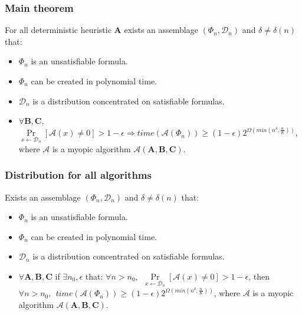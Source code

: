 \begin{frame}
	\frametitle{Main theorem}
	\pause
	\begin{theorem}
        For all deterministic heuristic $\mathbf{A}$
        exists an assemblage $(\Phi_n, \mathcal{D}_n)$ and $\delta \ne
        \delta(n)$ that:
        \pause
		\begin{itemize}
            \item $\Phi_n$ is an unsatisfiable formula.
        	\item $\Phi_n$ can be created in polynomial time.
            \pause
            \item $\mathcal{D}_n$ is a distribution concentrated on
		        satisfiable formulas.
            \pause
			\item $\forall \mathbf{B}, \mathbf{C}$,
				$\Pr\limits_{x \gets \mathcal{D}_n}[\mathcal{A}(x)
                \ne 0] > 1 - \epsilon \Rightarrow
                time(\mathcal{A}(\Phi_n)) \ge (1 - \epsilon) 2^{\Omega(min(n^\delta,
                \frac{n}{K}))}$, where $\mathcal{A}$ is a myopic algorithm
			    $\mathcal{A}(\mathbf{A}, \mathbf{B},\mathbf{C})$.
		\end{itemize}
	\end{theorem}
\end{frame}

\begin{frame}
    \frametitle{Distribution for all algorithms}

    \begin{theorem}
        Exists an assemblage $(\Phi_n, \mathcal{D}_n)$ and $\delta \ne
        \delta(n)$ that:
        \pause
        \begin{itemize}
            \item $\Phi_n$ is an unsatisfiable formula.
        	\item $\Phi_n$ can be created in polynomial time.
        	\pause
            \item $\mathcal{D}_n$ is a distribution concentrated on
		        satisfiable formulas.
            \pause
            \item $\forall \mathbf{A}, \mathbf{B}, \mathbf{C}$ 
		        if $\exists n_0, \epsilon$ that:
				$\forall n > n_0, ~~ \Pr\limits_{x \gets \mathcal{D}_n}[\mathcal{A}(x)
                \ne 0] > 1 - \epsilon$, then
                $\forall n > n_0, ~~ time(\mathcal{A}(\Phi_n)) \ge (1
                - \epsilon)2^{\Omega(min(n^\delta, \frac{n}{K}))}$,
                where $\mathcal{A}$ is a myopic algorithm
                $\mathcal{A}(\mathbf{A}, \mathbf{B},\mathbf{C})$.
        \end{itemize}
    \end{theorem}
\end{frame}

